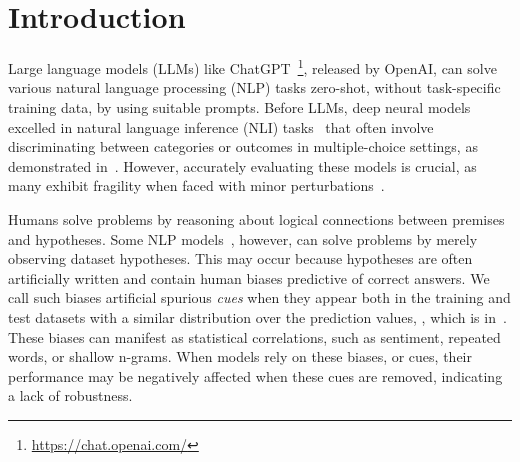 \section{Introduction}
\label{sec:intro}

Large language models (LLMs) like ChatGPT~\footnote{\url{https://chat.openai.com/}}, 
released by OpenAI, can solve various natural language processing (NLP) 
tasks zero-shot, without task-specific training data, by using suitable prompts. 
Before LLMs, deep neural models excelled in natural language 
inference (NLI) tasks~\cite{bowman2015large,wang2018glue,mostafazadeh2016corpus,roemmele2011choice,zellers2018swag} that often involve discriminating between 
categories or outcomes in multiple-choice settings, as demonstrated in~. 
However, accurately evaluating these models is crucial, 
as many exhibit fragility when faced with minor perturbations~\cite{checklist2020acl}.
\begin{center}
\end{center}

Humans solve problems by reasoning about logical connections 
between premises and hypotheses. 
Some NLP models~\cite{naik2018stress,schuster2019towards}, 
however, can solve problems by merely observing dataset hypotheses. 
This may occur because hypotheses are often artificially 
written and contain human biases predictive of correct answers. 
We call such biases artificial spurious \textit{cues} when
they appear both in the training and test datasets with a similar distribution
over the prediction values, , which is in~.
These biases can manifest as statistical correlations, 
such as sentiment, repeated words, or shallow n-grams. 
When models rely on these biases, or cues, 
their performance may be negatively affected 
when these cues are removed, indicating a lack of robustness.

